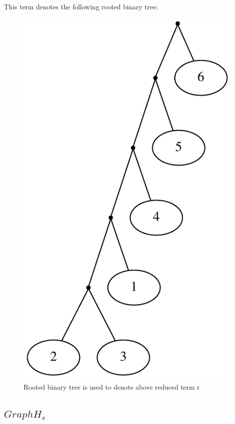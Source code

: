 \documentclass[a4paper, 12pt]{article}
\begin{document}
This term denotes the following rooted binary tree:\\
\begin{figure}[H]


\begin{centering}
\includegraphics[scale=0.5]{image/tree_by_r}
\caption{Rooted binary tree is used to denote above reduced term r}
\par\end{centering}

\end{figure}

\subsection{$Graph H_{s}$}
\end{document}
